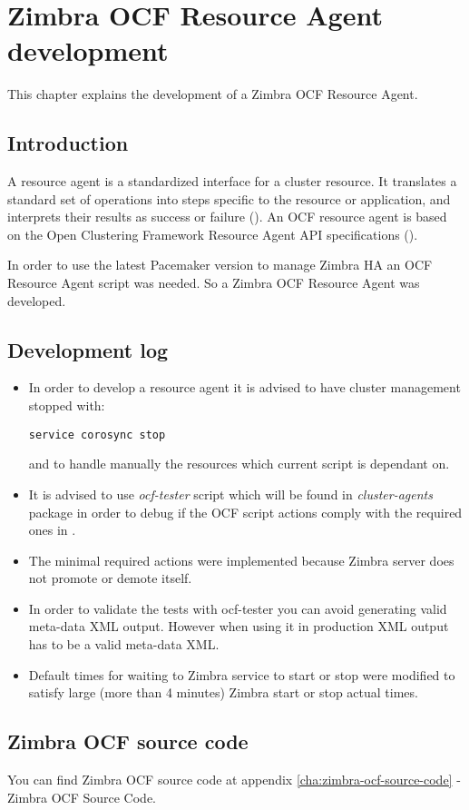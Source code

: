 

\chapter{Zimbra OCF Resource Agent development}
\label{chap:zimbra-ocf}
This chapter explains the development of a Zimbra OCF Resource Agent.

\section {Introduction}
A resource agent is a standardized interface for a cluster resource. It translates a standard set of operations into steps specific to the resource or application, and interprets their results as success or failure (\cite{ResourceAgentsWiki}). An OCF resource agent is based on the Open Clustering Framework Resource Agent API specifications (\cite{OCFResourceAgentsWiki}).

In order to use the latest Pacemaker version to manage Zimbra HA an OCF Resource Agent script was needed. So a Zimbra OCF Resource Agent was developed.

\section {Development log}
\begin{itemize}
  \item {In order to develop a resource agent it is advised to have cluster management stopped with:
\begin{verbatim}
service corosync stop
\end{verbatim}
and to handle manually the resources which current script is dependant on.
  }
  \item {It is advised to use \textit{ocf-tester} script which will be found in \textit{cluster-agents} package in order to debug if the OCF script actions comply with the required ones in \cite{OCFResourceAgentsWiki}.
  }
  \item {The minimal required actions were implemented because Zimbra server does not promote or demote itself.
  }
  \item {In order to validate the tests with ocf-tester you can avoid generating valid meta-data XML output. However when using it in production XML output has to be a valid meta-data XML. 
  }
  \item {Default times for waiting to Zimbra service to start or stop were modified to satisfy large (more than 4 minutes) Zimbra start or stop actual times.
  }
\end{itemize}

\section {Zimbra OCF source code}

You can find Zimbra OCF source code at appendix {\ref{cha:zimbra-ocf-source-code} - Zimbra OCF Source Code}.



